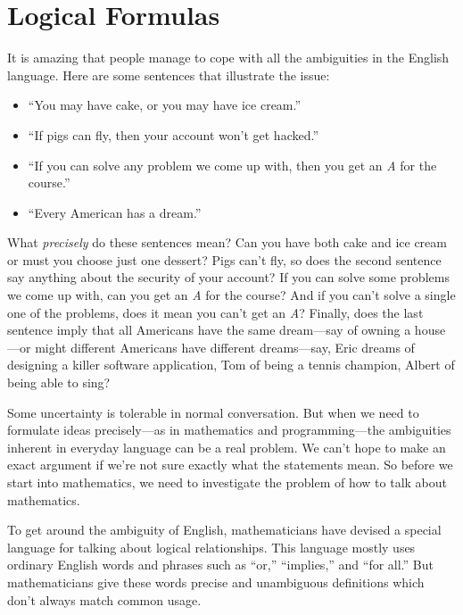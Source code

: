 \chapter{Logical Formulas}\label{logicform_chap}

It is amazing that people manage to cope with all the ambiguities in the
English language.  Here are some sentences that illustrate the issue:
\begin{itemize}
\item ``You may have cake, or you may have ice cream.''
\item ``If pigs can fly, then your account won't get hacked.''
\item ``If you can solve any problem we come up with, then you get an
  \emph{A} for the course.''
\item ``Every American has a dream.''
\end{itemize}
What \emph{precisely} do these sentences mean?  Can you have both
cake and ice cream or must you choose just one dessert?  Pigs can't
fly, so does the second sentence say anything about the security of
your account?  If you can solve some problems we come up with, can you
get an \emph{A} for the course?  And if you can't solve a single one
of the problems, does it mean you can't get an \emph{A}?  Finally,
does the last sentence imply that all Americans have the same
dream---say of owning a house---or might different Americans have
different dreams---say, Eric dreams of designing a killer software
application, Tom of being a tennis champion, Albert of being able to
sing?

Some uncertainty is tolerable in normal conversation.  But when we need to
formulate ideas precisely---as in mathematics and programming---the
ambiguities inherent in everyday language can be a real problem.  We can't
hope to make an exact argument if we're not sure exactly what the
statements mean.  So before we start into mathematics, we need to
investigate the problem of how to talk about mathematics.

To get around the ambiguity of English, mathematicians have devised a
special language for talking about logical relationships.  This
language mostly uses ordinary English words and phrases such as
``or,'' ``implies,'' and ``for all.''  But mathematicians give these
words precise and unambiguous definitions which don't always match
common usage.  \iffalse A pitfall to watch out for is confusing
ordinary language with mathematical language that sounds ordinary but
isn't.\fi

